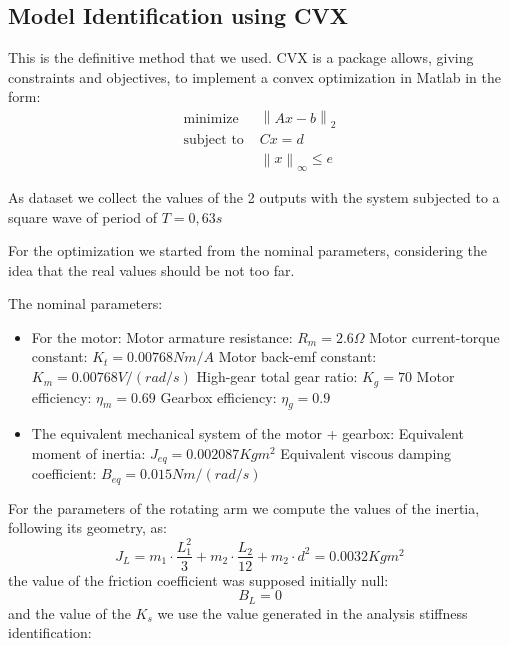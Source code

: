         \subsection{Model Identification using CVX}

            This is the definitive method that we used. CVX is a package allows, giving constraints and objectives, to implement a convex optimization in Matlab in the form:
            \begin{align*}
                \text{minimize   }  & \left\|Ax-b\right\|_{2} \\
                \text{subject to   }& Cx=d \\
                                    & \left\|x\right\|_{\infty} \leq e
            \end{align*}
                
            As dataset we collect the values of the 2 outputs with the system subjected to a square wave of period of $T = 0,63 s$ 

            For the optimization we started from the nominal parameters, considering the idea that the real values should be not too far. 
            
            The nominal parameters:

            \begin{itemize}
                \item For the motor:
                    \subitem Motor armature resistance: $R_m = 2.6 \Omega$
                    \subitem Motor current-torque constant: $K_t = 0.00768 Nm/A$
                    \subitem Motor back-emf constant: $K_m = 0.00768 V/(rad/s)$
                    \subitem High-gear total gear ratio: $K_g = 70$
                    \subitem Motor efficiency: $\eta_m = 0.69$
                    \subitem Gearbox efficiency: $\eta_g = 0.9$
                \item The equivalent mechanical system of the motor + gearbox:
                    \subitem Equivalent moment of inertia: $J_{eq} = 0.002087 Kg m^2$
                    \subitem Equivalent viscous damping coefficient: $B_{eq} = 0.015 Nm/(rad/s)$
            \end{itemize}

            For the parameters of the rotating arm we compute the values of the inertia, following its geometry, as:
                \[
                    J_L = m_1 \cdot \frac{L_1^2}{3} + m_2 \cdot \frac{L_2}{12} + m_2 \cdot d^2 = 0.0032 Kg m^2\]
            the value of the friction coefficient was supposed initially null:
                \[
                    B_L = 0\]
            and the value of the $K_s$ we use the value generated in the analysis stiffness identification:
                
